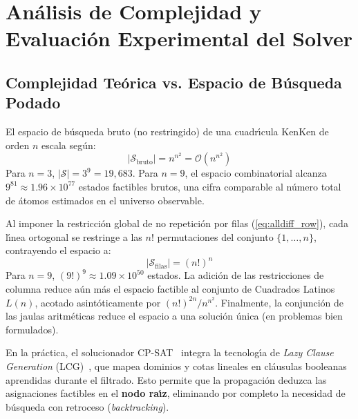 
\section{An\'alisis de Complejidad y Evaluaci\'on Experimental del Solver}
\label{sec:complexity_and_experiments}

\subsection{Complejidad Te\'orica vs. Espacio de B\'usqueda Podado}
El espacio de b\'usqueda bruto (no restringido) de una cuadr\'{\i}cula KenKen de orden $n$ escala seg\'un:
\begin{equation}
    |\mathcal{S}_{\text{bruto}}| = n^{n^2} = \mathcal{O}(n^{n^2})
\end{equation}
Para $n=3$, $|\mathcal{S}| = 3^9 = 19{,}683$. Para $n=9$, el espacio combinatorial alcanza $9^{81} \approx 1.96 \times 10^{77}$ estados factibles brutos, una cifra comparable al n\'umero total de \'atomos estimados en el universo observable.

Al imponer la restricci\'on global de no repetici\'on por filas (\ref{eq:alldiff_row}), cada l\'{\i}nea ortogonal se restringe a las $n!$ permutaciones del conjunto $\{1, \dots, n\}$, contrayendo el espacio a:
\begin{equation}
    |\mathcal{S}_{\text{filas}}| = (n!)^n
\end{equation}
Para $n=9$, $(9!)^9 \approx 1.09 \times 10^{50}$ estados. La adici\'on de las restricciones de columna reduce a\'un m\'as el espacio factible al conjunto de Cuadrados Latinos $L(n)$, acotado asint\'oticamente por $(n!)^{2n} / n^{n^2}$. Finalmente, la conjunci\'on de las jaulas aritm\'eticas reduce el espacio a una soluci\'on \'unica (en problemas bien formulados).

En la pr\'actica, el solucionador CP-SAT~\cite{perron2023cpsat, perron2024ortools} integra la tecnolog\'{\i}a de \textit{Lazy Clause Generation} (LCG)~\cite{ohrimenko2009lazy}, que mapea dominios y cotas lineales en cl\'ausulas booleanas aprendidas durante el filtrado. Esto permite que la propagaci\'on deduzca las asignaciones factibles en el \textbf{nodo ra\'{\i}z}, eliminando por completo la necesidad de b\'usqueda con retroceso (\textit{backtracking}).

